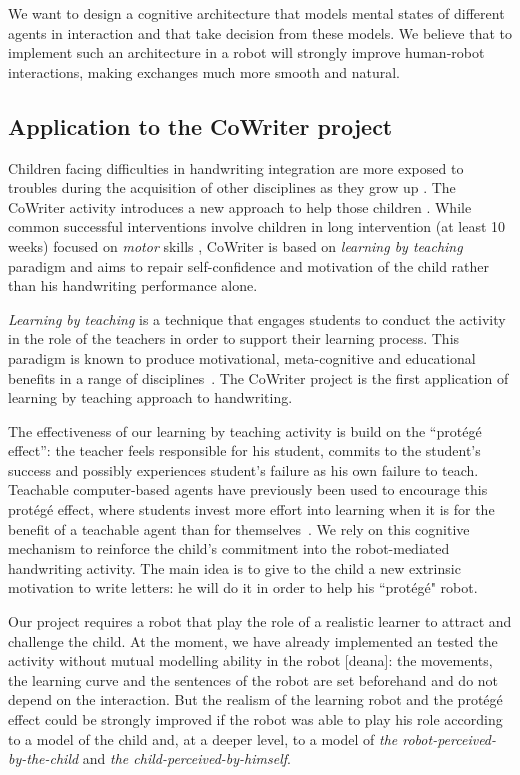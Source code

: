 \documentclass[10pt,a4paper,twocolumn]{article}
\begin{document}
We want to design a cognitive architecture that models mental states of different agents in interaction and that take decision from these models. We believe that to implement such an architecture in a robot will strongly improve human-robot interactions, making exchanges much more smooth and natural. 

\subsection{Application to the CoWriter project}
Children facing difficulties in handwriting integration are more exposed
to troubles during the acquisition of other disciplines as they grow up
\cite{Christensen2005}. 
The CoWriter activity introduces a new approach to help those children
\cite{Hood}. While common successful interventions involve children
in long intervention (at least 10 weeks) focused on \emph{motor} skills \cite{Hoy2011},
CoWriter is based on \emph{learning by teaching} paradigm and aims to repair
self-confidence and motivation of the child rather than his handwriting performance alone.

\emph{Learning by teaching} is a technique that engages students to conduct the activity in the role of the teachers in order to support their learning process. This 
paradigm is known to produce motivational, meta-cognitive and educational
benefits in a range of disciplines~\cite{Rohrbeck2003}. The CoWriter project
is the first application of learning by teaching approach to handwriting. 

The effectiveness of our learning by teaching activity is build on the
``prot\'eg\'e effect'': the teacher feels responsible for his student, commits
to the student's success and possibly experiences student's failure as his own
failure to teach. Teachable computer-based agents have previously been used to
encourage this prot\'eg\'e effect, where students invest more effort into
learning when it is for the benefit of a teachable agent than for themselves~\cite{Chase2009}.
We rely on this cognitive mechanism to reinforce the child's commitment into the
robot-mediated handwriting activity. The main idea is to give to the child a new extrinsic motivation to write letters: he will do it in order to help his ``prot\'eg\'e" robot.

Our project requires a robot that play the role of a realistic learner to attract and challenge the child. At the moment, we have already implemented an tested the activity without mutual modelling ability in the robot [deana]: the movements, the learning curve and the sentences of the robot are set beforehand and do not depend on the interaction. But the realism of the learning robot and the prot\'eg\'e effect could be strongly improved if the robot was able to play his role according to a model of the child and, at a deeper level, to a model of \textit{the robot-perceived-by-the-child} and \textit{the child-perceived-by-himself}.
\end{document}
